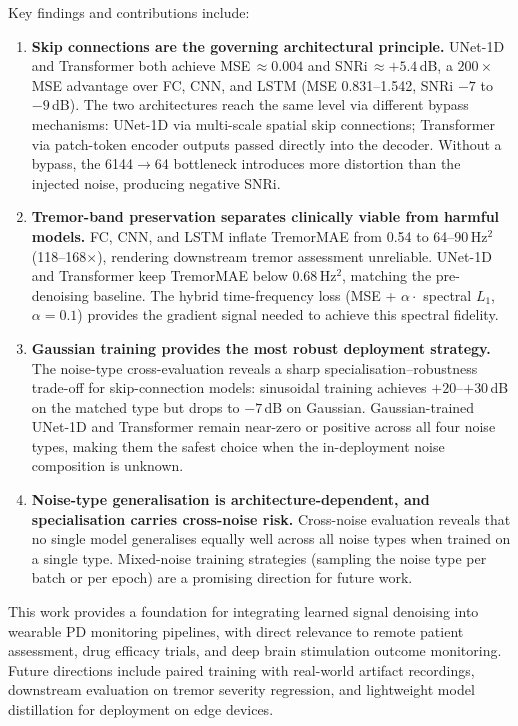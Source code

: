 \documentclass{article}
\begin{document}
Key findings and contributions include:
\begin{enumerate}
  \item \textbf{Skip connections are the governing architectural principle.}
    UNet-1D and Transformer both achieve MSE\,$\approx 0.004$ and
    SNRi\,$\approx +5.4$\,dB, a $200\times$ MSE advantage over FC, CNN, and
    LSTM (MSE 0.831--1.542, SNRi $-7$ to $-9$\,dB).
    The two architectures reach the same level via different bypass
    mechanisms: UNet-1D via multi-scale spatial skip connections;
    Transformer via patch-token encoder outputs passed directly into the
    decoder.
    Without a bypass, the 6144$\to$64 bottleneck introduces more distortion
    than the injected noise, producing negative SNRi.
  \item \textbf{Tremor-band preservation separates clinically viable from
    harmful models.}
    FC, CNN, and LSTM inflate TremorMAE from 0.54 to 64--90\,Hz$^2$
    (118--168$\times$), rendering downstream tremor assessment unreliable.
    UNet-1D and Transformer keep TremorMAE below 0.68\,Hz$^2$, matching
    the pre-denoising baseline.
    The hybrid time-frequency loss (MSE + $\alpha \cdot$ spectral $L_1$,
    $\alpha=0.1$) provides the gradient signal needed to achieve this
    spectral fidelity.
  \item \textbf{Gaussian training provides the most robust deployment
    strategy.}
    The noise-type cross-evaluation reveals a sharp specialisation--robustness
    trade-off for skip-connection models: sinusoidal training achieves
    $+20$--$+30$\,dB on the matched type but drops to $-7$\,dB on Gaussian.
    Gaussian-trained UNet-1D and Transformer remain near-zero or positive
    across all four noise types, making them the safest choice when the
    in-deployment noise composition is unknown.
  \item \textbf{Noise-type generalisation is architecture-dependent, and
    specialisation carries cross-noise risk.}
    Cross-noise evaluation reveals that no single model generalises equally
    well across all noise types when trained on a single type.
    Mixed-noise training strategies (sampling the noise type per batch or per
    epoch) are a promising direction for future work.
\end{enumerate}

This work provides a foundation for integrating learned signal denoising
into wearable PD monitoring pipelines, with direct relevance to remote
patient assessment, drug efficacy trials, and deep brain stimulation
outcome monitoring.
Future directions include paired training with real-world artifact
recordings, downstream evaluation on tremor severity regression, and
lightweight model distillation for deployment on edge devices.
\end{document}
